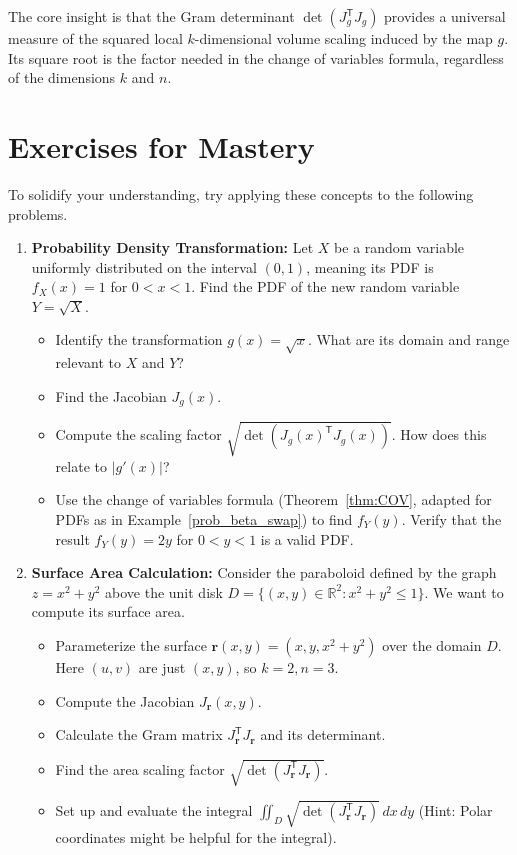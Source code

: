\documentclass[12pt]{article}
\theoremstyle{definition} %
\theoremstyle{plain} %
\theoremstyle{remark} %
\begin{document}
The core insight is that the Gram determinant $\det(J_g^{\mathsf{T}} J_g)$ provides a universal measure of the squared local $k$-dimensional volume scaling induced by the map $g$. Its square root is the factor needed in the change of variables formula, regardless of the dimensions $k$ and $n$.

\section{Exercises for Mastery}

To solidify your understanding, try applying these concepts to the following problems.

\begin{enumerate}[label=\arabic*., itemsep=0.5em, leftmargin=*]
    \item \textbf{Probability Density Transformation:} Let $X$ be a random variable uniformly distributed on the interval $(0,1)$, meaning its PDF is $f_X(x) = 1$ for $0 < x < 1$. Find the PDF of the new random variable $Y = \sqrt{X}$.
        \begin{itemize}
            \item Identify the transformation $g(x) = \sqrt{x}$. What are its domain and range relevant to $X$ and $Y$?
            \item Find the Jacobian $J_g(x)$.
            \item Compute the scaling factor $\sqrt{\det(J_g(x)^{\mathsf{T}} J_g(x))}$. How does this relate to $|g'(x)|$?
            \item Use the change of variables formula (Theorem~\ref{thm:COV}, adapted for PDFs as in Example~\ref{prob_beta_swap}) to find $f_Y(y)$. Verify that the result $f_Y(y) = 2y$ for $0 < y < 1$ is a valid PDF.
        \end{itemize}

    \item \textbf{Surface Area Calculation:} Consider the paraboloid defined by the graph $z = x^2 + y^2$ above the unit disk $D = \{(x,y) \in \mathbb{R}^2 : x^2 + y^2 \le 1\}$. We want to compute its surface area.
        \begin{itemize}
            \item Parameterize the surface $\mathbf{r}(x,y) = (x, y, x^2+y^2)$ over the domain $D$. Here $(u,v)$ are just $(x,y)$, so $k=2, n=3$.
            \item Compute the Jacobian $J_{\mathbf{r}}(x,y)$.
            \item Calculate the Gram matrix $J_{\mathbf{r}}^{\mathsf{T}} J_{\mathbf{r}}$ and its determinant.
            \item Find the area scaling factor $\sqrt{\det(J_{\mathbf{r}}^{\mathsf{T}} J_{\mathbf{r}})}$.
            \item Set up and evaluate the integral $\iint_D \sqrt{\det(J_{\mathbf{r}}^{\mathsf{T}} J_{\mathbf{r}})} \,dx\,dy$ (Hint: Polar coordinates might be helpful for the integral).
        \end{itemize}


\end{enumerate}
\end{document}
